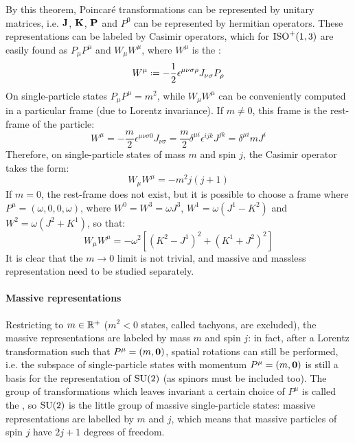 By this theorem, Poincaré transformations can be represented by unitary matrices, i.e. $ \mathbf{J} $, $ \mathbf{K} $, $ \mathbf{P} $ and $ P^0 $ can be represented by hermitian operators. These representations can be labeled by Casimir operators, which for $ \mathrm{ISO}^+(1,3) $ are easily found as $ P_\mu P^\mu $ and $ W_\mu W^\mu $, where $ W^\mu $ is the :
\begin{equation}
  W^\mu \defeq -\frac{1}{2} \epsilon^{\mu \nu \sigma \rho} J_{\nu \sigma} P_\rho
\end{equation}
On single-particle states $ P_\mu P^\mu = m^2 $, while $ W_\mu W^\mu $ can be conveniently computed in a particular frame (due to Lorentz invariance). If $ m \neq 0 $, this frame is the rest-frame of the particle:
\begin{equation*}
  W^\mu = - \frac{m}{2} \epsilon^{\mu \nu \sigma 0} J_{\nu \sigma} = \frac{m}{2} \delta^{\mu i} \epsilon^{ijk} J^{jk} = \delta^{\mu i} m J^i
\end{equation*}
Therefore, on single-particle states of mass $ m $ and spin $ j $, the Casimir operator takes the form:
\begin{equation}
  W_\mu W^\mu = - m^2 j \left( j + 1 \right)
\end{equation}
If $ m = 0 $, the rest-frame does not exist, but it is possible to choose a frame where $ P^\mu = (\omega,0,0,\omega) $, where $ W^0 = W^3 = \omega J^3 $, $ W^1 = \omega \left( J^1 - K^2 \right) $ and $ W^2 = \omega \left( J^2 + K^1 \right) $, so that:
\begin{equation}
  W_\mu W^\mu = - \omega^2 \left[ \left( K^2 - J^1 \right)^2 + \left( K^1 + J^2 \right)^2 \right]
\end{equation}
It is clear that the $ m \rightarrow 0 $ limit is not trivial, and massive and massless representation need to be studied separately.

\paragraph{Massive representations}

Restricting to $ m \in \mathbb{R}^+ $ ($ m^2 < 0 $ states, called tachyons, are excluded), the massive representations are labeled by mass $ m $ and spin $ j $: in fact, after a Lorentz transformation such that $ P^\mu = (m,\mathbf{0}) $, spatial rotations can still be performed, i.e. the subspace of single-particle states with momentum $ P^\mu = (m,\mathbf{0}) $ is still a basis for the representation of $ \mathrm{SU}(2) $ (as spinors must be included too). The group of transformations which leaves invariant a certain choice of $ P^\mu $ is called the , so $ \mathrm{SU}(2) $ is the little group of massive single-particle states: massive representations are labelled by $ m $ and $ j $, which means that massive particles of spin $ j $ have $ 2j + 1 $ degrees of freedom.

